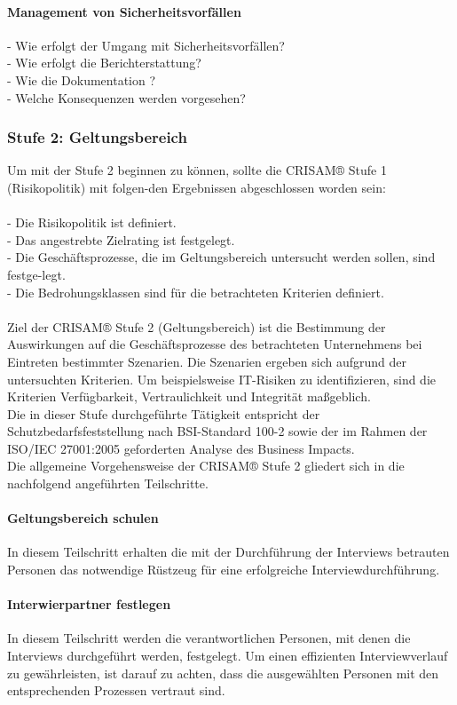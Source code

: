 \paragraph{Management von Sicherheitsvorfällen}
- Wie erfolgt der Umgang mit Sicherheitsvorfällen?
\\- Wie erfolgt die Berichterstattung?
\\- Wie die Dokumentation ?
\\- Welche Konsequenzen werden vorgesehen?
\newpage
\subsubsection {Stufe 2: Geltungsbereich}
Um mit der Stufe 2 beginnen zu können, sollte die CRISAM® Stufe 1 (Risikopolitik) mit folgen-den Ergebnissen abgeschlossen worden sein:\\
\\- Die Risikopolitik ist definiert.
\\- Das angestrebte Zielrating ist festgelegt.
\\- Die Geschäftsprozesse, die im Geltungsbereich untersucht werden sollen, sind festge-legt.
\\- Die Bedrohungsklassen sind für die betrachteten Kriterien definiert.\\
\\
Ziel der CRISAM® Stufe 2 (Geltungsbereich) ist die Bestimmung der Auswirkungen auf die Geschäftsprozesse des betrachteten Unternehmens bei Eintreten bestimmter Szenarien. Die Szenarien ergeben sich aufgrund der untersuchten Kriterien. Um beispielsweise IT-Risiken zu identifizieren, sind die Kriterien Verfügbarkeit, Vertraulichkeit und Integrität maßgeblich.\\
Die in dieser Stufe durchgeführte Tätigkeit entspricht der Schutzbedarfsfeststellung nach BSI-Standard 100-2 sowie der im Rahmen der ISO/IEC 27001:2005 geforderten Analyse des Business Impacts.\\
Die allgemeine Vorgehensweise der CRISAM® Stufe 2 gliedert sich in die nachfolgend angeführten Teilschritte.
\paragraph{Geltungsbereich schulen}
In diesem Teilschritt erhalten die mit der Durchführung der Interviews betrauten Personen das notwendige Rüstzeug für eine erfolgreiche Interviewdurchführung.
\paragraph{Interwierpartner festlegen}
In diesem Teilschritt werden die verantwortlichen Personen, mit denen die Interviews durchgeführt werden, festgelegt. Um einen effizienten Interviewverlauf zu gewährleisten, ist darauf zu achten, dass die ausgewählten Personen mit den entsprechenden Prozessen vertraut sind.
